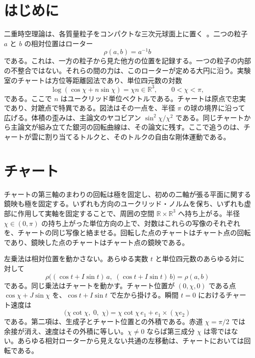 \documentclass[a4paper]{article}
\begin{document}
\section{はじめに}

二重時空理論は、各質量粒子をコンパクトな三次元球面上に置く~\cite{dst-main}。二つの粒子 \(a\) と \(b\) の相対位置はローター
\[
\rho(a,b)=a^{-1}b
\]
である。これは、一方の粒子から見た他方の位置を記録する。一つの粒子の内部の不整合ではない。それらの間の力は、このローターが定める大円に沿う。実験室のチャートは方位等距離図法であり、単位四元数の対数
\begin{equation}
\label{eq:log}
\log(\cos\chi+n\sin\chi)=\chi n\in\mathbb{R}^3,
\qquad 0<\chi<\pi,
\end{equation}
である。ここで \(n\) はユークリッド単位ベクトルである。チャートは原点で忠実であり、対蹠点で特異である。図法はその一点を、半径 \(\pi\) の球の境界に沿って広げる。体積の歪みは、主論文のヤコビアン \(\sin^2\chi/\chi^2\) である。同じチャートから主論文が組み立てた銀河の回転曲線は、その論文に残す。ここで追うのは、チャートが雲に割り当てるトルクと、そのトルクの自由な剛体運動である。

\section{チャート}
\label{sec:chart}

チャートの第三軸のまわりの回転は極を固定し、初めの二軸が張る平面に関する鏡映も極を固定する。いずれも方向のユークリッド・ノルムを保ち、いずれも虚部に作用して実軸を固定することで、周囲の空間 \(\mathbb{R}\times\mathbb{R}^3\) へ持ち上がる。半径 \(\chi\in(0,\pi)\) の持ち上がった単位方向の上で、対数はこれらの写像のそれぞれを、チャートの同じ写像と絡ませる。回転した点のチャートはチャート点の回転であり、鏡映した点のチャートはチャート点の鏡映である。

左乗法は相対位置を動かさない。あらゆる実数 \(t\) と単位四元数のあらゆる対に対して
\begin{equation}
\label{eq:left-relative}
\rho\bigl((\cos t+I\sin t)\,a,\;(\cos t+I\sin t)\,b\bigr)=\rho(a,b)
\end{equation}
である。同じ乗法はチャートを動かす。チャート位置が \((0,\chi,0)\) である点 \(\cos\chi+J\sin\chi\) を、\(\cos t+I\sin t\) で左から掛ける。瞬間 \(t=0\) におけるチャート速度は
\begin{equation}
\label{eq:left-velocity}
\bigl(\chi\cot\chi,\;0,\;\chi\bigr)
=
\chi\cot\chi\,e_1
+
e_1\times(\chi e_2)
\end{equation}
である。第二項は、生成子とチャート位置との外積である。赤道 \(\chi=\pi/2\) では余接が消え、速度はその外積に等しい。\(\chi\neq 0\) ならば第三成分 \(\chi\) は零ではない。あらゆる相対ローターから見えない共通の左移動は、チャートにおいては回転である。
\end{document}
